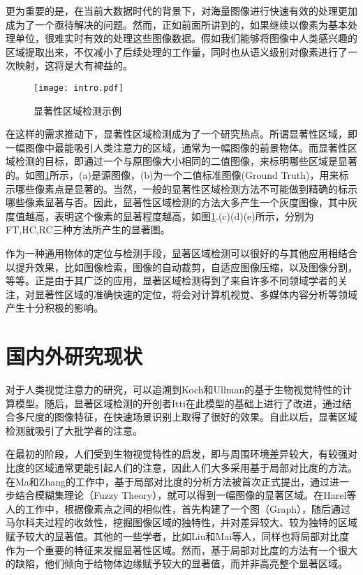 更为重要的是，在当前大数据时代的背景下，对海量图像进行快速有效的处理更加成为了一个亟待解决的问题。然而，正如前面所讲到的，如果继续以像素为基本处理单位，很难实时有效的处理这些图像数据。假如我们能够将图像中人类感兴趣的区域提取出来，不仅减小了后续处理的工作量，同时也从语义级别对像素进行了一次映射，这将是大有裨益的。

\begin{figure}[b]
\texttt{[image: intro.pdf]}
\caption{显著性区域检测示例}\label{fig:intro}
\end{figure}

在这样的需求推动下，显著性区域检测成为了一个研究热点。所谓显著性区域，即一幅图像中最能吸引人类注意力的区域，通常为一幅图像的前景物体。而显著性区域检测的目标，即通过一个与原图像大小相同的二值图像，来标明哪些区域是显著的。如图\ref{fig:intro}所示，(a)是源图像，(b)为一个二值标准图像(Ground Truth)，用来标示哪些像素点是显著的。当然，一般的显著性区域检测方法不可能做到精确的标示哪些像素显著与否。因此，显著性区域检测的方法大多产生一个灰度图像，其中灰度值越高，表明这个像素的显著程度越高，如图\ref{fig:intro}.(c)(d)(e)所示，分别为FT\cite{achanta2009frequency},HC\cite{cheng2011global},RC\cite{cheng2011global}三种方法所产生的显著图。

作为一种通用物体的定位与检测手段，显著区域检测可以很好的与其他应用相结合以提升效果，比如图像检索\cite{tsai2012hierarchical}\cite{fang2012effective}，图像的自动裁剪\cite{shechtman2013methods}\cite{deigmoeller2010context}，自适应图像压缩\cite{christopoulos2000jpeg2000}，以及图像分割\cite{jiang2011automatic}\cite{han2006unsupervised}，等等。正是由于其广泛的应用，显著区域检测得到了来自许多不同领域学者的关注，对显著性区域的准确快速的定位，将会对计算机视觉、多媒体内容分析等领域产生十分积极的影响。

\section{国内外研究现状}
对于人类视觉注意力的研究，可以追溯到Koch和Ullman\cite{koch1987shifts}的基于生物视觉特性的计算模型。随后，显著区域检测的开创者Itti\cite{itti1998model}在此模型的基础上进行了改进，通过结合多尺度的图像特征，在快速场景识别上取得了很好的效果。自此以后，显著区域检测就吸引了大批学者的注意。

在最初的阶段，人们受到生物视觉特性的启发，即与周围环境差异较大，有较强对比度的区域通常更能引起人们的注意，因此人们大多采用基于局部对比度的方法。在Ma和Zhang的工作中\cite{ma2003contrast}，基于局部对比度的分析方法被首次正式提出，通过进一步结合模糊集理论（Fuzzy Theory），就可以得到一幅图像的显著区域。在Harel等人的工作中\cite{harel2006graph}，根据像素点之间的相似性，首先构建了一个图（Graph），随后通过马尔科夫过程的收敛性，挖掘图像区域的独特性，并对差异较大、较为独特的区域赋予较大的显著值。其他的一些学者，比如Liu\cite{liu2011learning}和Mai\cite{maisaliency}等人，同样也将局部对比度作为一个重要的特征来发掘显著性区域。然而，基于局部对比度的方法有一个很大的缺陷，他们倾向于给物体边缘赋予较大的显著值，而并非高亮整个显著区域。

